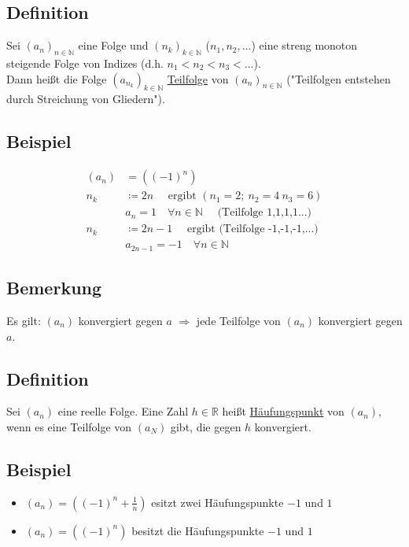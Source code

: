 \documentclass[12pt, titlepage]{article}
\newcommand{\R}{\mathds{R}}
\newcommand{\N}{\mathds{N}}
\renewcommand{\*}{\cdot}
\begin{document}
	\subsection{Definition}
	Sei $(a_n)_{n\in\N}$ eine Folge und $(n_k)_{k\in\N}$ ($n_1,n_2,...$) eine streng monoton steigende Folge von Indizes (d.h. $n_1<n_2<n_3<...$).\\
	Dann heißt die Folge $(a_{n_k})_{k\in\N}$ \underline{Teilfolge} von $(a_n)_{n\in\N}$ ("Teilfolgen entstehen durch Streichung von Gliedern").
	\subsection{Beispiel}
	\begin{align*}
		(a_n)&=((-1)^n)\\
		n_k&\coloneqq 2n\quad\textrm{ ergibt  }(n_1=2;\ n_2=4\ n_3=6)\\
		&a_n=1\quad\forall n\in\N\quad\textrm{ (Teilfolge 1,1,1,1...)}\\
		n_k&\coloneqq 2n-1\quad\textrm{ ergibt (Teilfolge -1,-1,-1,...)}\\
		&a_{2n-1}=-1\quad\forall n\in\N
	\end{align*}
	\subsection{Bemerkung}
	Es gilt: $(a_n)$ konvergiert gegen $a$ $\Rightarrow$ jede Teilfolge von $(a_n)$ konvergiert gegen $a$.
	\subsection{Definition}
	Sei $(a_n)$ eine reelle Folge.
	Eine Zahl $h\in\R$ heißt \underline{Häufungspunkt} von $(a_n)$, wenn es eine Teilfolge von $(a_N)$ gibt, die gegen $h$ konvergiert.
	\subsection{Beispiel}
	\begin{itemize}
		\item $(a_n)=((-1)^n+\frac{1}{n})$ esitzt zwei Häufungspunkte $-1$ und $1$
		\item $(a_n)=((-1)^n)$ besitzt die Häufungspunkte $-1$ und $1$
	\end{itemize}
\end{document}
